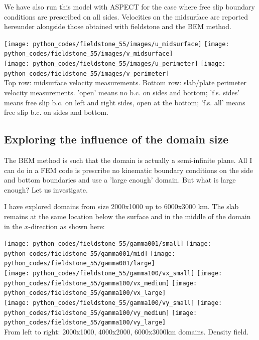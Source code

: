 We have also run this model with ASPECT for the case where free slip 
boundary conditions are prescribed on all sides. 
Velocities on the midsurface are reported hereunder alongside those
obtained with fieldstone and the BEM method.

\begin{center}
\texttt{[image: python\_codes/fieldstone\_55/images/u\_midsurface]}
\texttt{[image: python\_codes/fieldstone\_55/images/v\_midsurface]}\\
\texttt{[image: python\_codes/fieldstone\_55/images/u\_perimeter]}
\texttt{[image: python\_codes/fieldstone\_55/images/v\_perimeter]}\\
{\captionfont Top row: midsurface velocity measurements. Bottom row: slab/plate perimeter 
velocity measurements. 'open' means no b.c. on sides and bottom; 'f.s. sides' means 
free slip b.c. on left and right sides, open at the bottom; 'f.s. all' means 
free slip b.c. on sides and bottom.}
\end{center}

\newpage
\subsection*{Exploring the influence of the domain size}

The BEM method is such that the domain is actually a semi-infinite plane.
All I can do in a FEM code is prescribe no kinematic boundary conditions on the side and bottom 
boundaries and use a 'large enough' domain. But what is large enough? Let us investigate.

I have explored domains from size 2000x1000 up to 6000x3000 km. 
The slab remains at the same location below the surface and in the middle of the domain
in the $x$-direction as shown here:
\begin{center}
\texttt{[image: python\_codes/fieldstone\_55/gamma001/small]}
\texttt{[image: python\_codes/fieldstone\_55/gamma001/mid]}
\texttt{[image: python\_codes/fieldstone\_55/gamma001/large]}\\
\texttt{[image: python\_codes/fieldstone\_55/gamma100/vx\_small]}
\texttt{[image: python\_codes/fieldstone\_55/gamma100/vx\_medium]}
\texttt{[image: python\_codes/fieldstone\_55/gamma100/vx\_large]}\\
\texttt{[image: python\_codes/fieldstone\_55/gamma100/vy\_small]}
\texttt{[image: python\_codes/fieldstone\_55/gamma100/vy\_medium]}
\texttt{[image: python\_codes/fieldstone\_55/gamma100/vy\_large]}\\
{\captionfont From left to right: 2000x1000, 4000x2000, 6000x3000km domains. Density field.}
\end{center}

